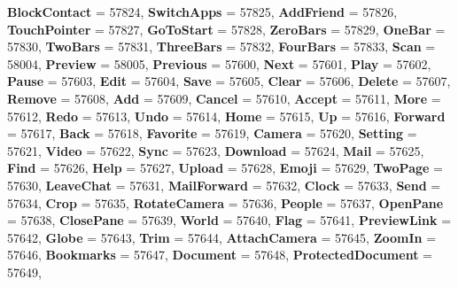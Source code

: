 \begin{DoxyCompactItemize}
{\bfseries Block\+Contact} = 57824, 
{\bfseries Switch\+Apps} = 57825, 
{\bfseries Add\+Friend} = 57826, 
\newline
{\bfseries Touch\+Pointer} = 57827, 
{\bfseries Go\+To\+Start} = 57828, 
{\bfseries Zero\+Bars} = 57829, 
{\bfseries One\+Bar} = 57830, 
\newline
{\bfseries Two\+Bars} = 57831, 
{\bfseries Three\+Bars} = 57832, 
{\bfseries Four\+Bars} = 57833, 
{\bfseries Scan} = 58004, 
\newline
{\bfseries Preview} = 58005, 
{\bfseries Previous} = 57600, 
{\bfseries Next} = 57601, 
{\bfseries Play} = 57602, 
\newline
{\bfseries Pause} = 57603, 
{\bfseries Edit} = 57604, 
{\bfseries Save} = 57605, 
{\bfseries Clear} = 57606, 
\newline
{\bfseries Delete} = 57607, 
{\bfseries Remove} = 57608, 
{\bfseries Add} = 57609, 
{\bfseries Cancel} = 57610, 
\newline
{\bfseries Accept} = 57611, 
{\bfseries More} = 57612, 
{\bfseries Redo} = 57613, 
{\bfseries Undo} = 57614, 
\newline
{\bfseries Home} = 57615, 
{\bfseries Up} = 57616, 
{\bfseries Forward} = 57617, 
{\bfseries Back} = 57618, 
\newline
{\bfseries Favorite} = 57619, 
{\bfseries Camera} = 57620, 
{\bfseries Setting} = 57621, 
{\bfseries Video} = 57622, 
\newline
{\bfseries Sync} = 57623, 
{\bfseries Download} = 57624, 
{\bfseries Mail} = 57625, 
{\bfseries Find} = 57626, 
\newline
{\bfseries Help} = 57627, 
{\bfseries Upload} = 57628, 
{\bfseries Emoji} = 57629, 
{\bfseries Two\+Page} = 57630, 
\newline
{\bfseries Leave\+Chat} = 57631, 
{\bfseries Mail\+Forward} = 57632, 
{\bfseries Clock} = 57633, 
{\bfseries Send} = 57634, 
\newline
{\bfseries Crop} = 57635, 
{\bfseries Rotate\+Camera} = 57636, 
{\bfseries People} = 57637, 
{\bfseries Open\+Pane} = 57638, 
\newline
{\bfseries Close\+Pane} = 57639, 
{\bfseries World} = 57640, 
{\bfseries Flag} = 57641, 
{\bfseries Preview\+Link} = 57642, 
\newline
{\bfseries Globe} = 57643, 
{\bfseries Trim} = 57644, 
{\bfseries Attach\+Camera} = 57645, 
{\bfseries Zoom\+In} = 57646, 
\newline
{\bfseries Bookmarks} = 57647, 
{\bfseries Document} = 57648, 
{\bfseries Protected\+Document} = 57649, 

\end{DoxyCompactItemize}
